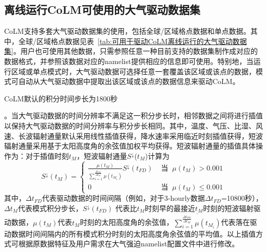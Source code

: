 \subsection{离线运行CoLM可使用的大气驱动数据集}\label{离线大气驱动数据集}
CoLM支持多套大气驱动数据集的使用，包括全球/区域格点数据和单点数据。其中，全球/区域格点数据见表~\ref{tab:可用于驱动CoLM离线运行的大气驱动数据集}。用户也可使用其他数据，只需参照任意一种目前支持的数据集制作成对应的数据格式，并参照该数据对应的namelist提供相应的信息即可使用。特别地，当运行区域或单点模式时，大气驱动数据可选择任意一套覆盖该区域或该点的数据，模式可自动从大气驱动数据中提取出该区域或该点的数据信息来驱动CoLM。

\hypertarget{驱动数据时间尺度插值}{CoLM默认的积分时间步长为1800秒}。当大气驱动数据的时间分辨率不满足这一积分步长时，相邻数据之间将进行插值以保持大气驱动数据的时间分辨率与积分步长相同。其中，温度、气压、比湿、风速、长波辐射通量默认采用线性插值获得，降水速率采用临近时刻插值获得，短波辐射通量采用基于太阳高度角的余弦值加权平均获得。短波辐射通量的插值具体操作为：对于插值时刻$t_M$，短波辐射通量$S^{\downarrow}$($t_M$)计算为
\begin{equation}\label{t_M}
S^{\downarrow}\left(t_{M}\right)=\left\{\begin{array}{ll}\frac{ \mu\left(t_{M}\right)}{\overline {\sum_{i=1}^{\frac{\Delta t_{FD}}{\Delta t_{M}}} \mu\left(t_{M_{i}}\right)}}S^{\downarrow}\left(t_{F D}\right)  & \text { 当 }\ \mu\left(t_{M}\right)>0.001 \\
0 & \text { 当 }\ \mu\left(t_{M}\right) \leqslant 0.001\end{array}\right.
\end{equation}
其中，$\Delta t_{FD}$代表驱动数据的时间间隔（例如，对于3-hourly数据$\Delta t_{FD}$=10800秒），$\Delta t_{M}$代表模式积分步长，$S^{\downarrow}(t_{FD})$ 代表比$t_M$时刻早的最接近$t_M$时刻的短波辐射驱动数据，$\mu\left(t_M\right)$代表$t_M$时刻的太阳高度角的余弦值，$\overline{
\sum_{i=1}^{\frac{\Delta t_{F D}}{\Delta t_{M}}} \mu\left(t_{M_{i}}\right)}$代表落在驱动数据时间间隔内的所有模式积分时刻的太阳高度角余弦值的平均值。以上插值方式可根据原数据特征及用户需求在大气强迫namelist配置文件中进行修改。

